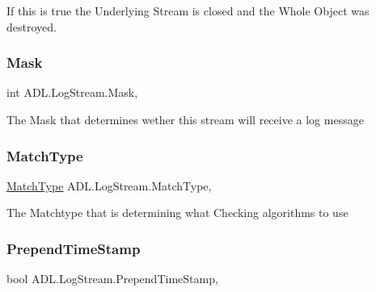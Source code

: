 If this is true the Underlying Stream is closed and the Whole Object was destroyed. 

\mbox{\label{class_a_d_l_1_1_log_stream_af23693ee745713d880e582484abdcee4}} 
\subsubsection{\texorpdfstring{Mask}{Mask}}
{\footnotesize\ttfamily int A\+D\+L.\+Log\+Stream.\+Mask\hspace{0.3cm}{\ttfamily [get]}, {\ttfamily [set]}}



The Mask that determines wether this stream will receive a log message 

\mbox{\label{class_a_d_l_1_1_log_stream_a25e7b0c79959a4c51d2bcfa072d1737e}} 
\subsubsection{\texorpdfstring{Match\+Type}{MatchType}}
{\footnotesize\ttfamily \mbox{\hyperlink{namespace_a_d_l_af6334296dbae0383a652317263f0bc05}{Match\+Type}} A\+D\+L.\+Log\+Stream.\+Match\+Type\hspace{0.3cm}{\ttfamily [get]}, {\ttfamily [set]}}



The Matchtype that is determining what Checking algorithms to use 

\mbox{\label{class_a_d_l_1_1_log_stream_a9d77af7e36ed281e83c500dfd28edfcd}} 
\subsubsection{\texorpdfstring{Prepend\+Time\+Stamp}{PrependTimeStamp}}
{\footnotesize\ttfamily bool A\+D\+L.\+Log\+Stream.\+Prepend\+Time\+Stamp\hspace{0.3cm}{\ttfamily [get]}, {\ttfamily [set]}}



